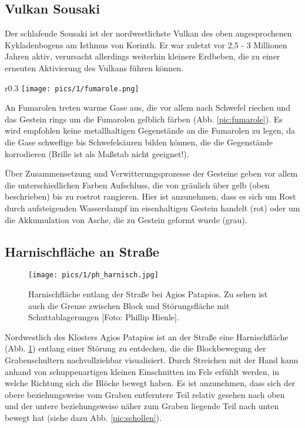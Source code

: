 \documentclass[preprint]{geomorphica} %
\begin{document}
\subsection{Vulkan Sousaki}

Der schlafende Sousaki ist der nordwestlichste Vulkan des oben angesprochenen Kykladenbogens am Isthmus von Korinth. Er war zuletzt vor 2,5 - 3 Millionen Jahren aktiv, verursacht allerdings weiterhin kleinere Erdbeben, die zu einer erneuten Aktivierung des Vulkans führen können.

\begin{wrapfigure}{r}{0.3\textwidth}
    \centering
    \texttt{[image: pics/1/fumarole.png]}
    \caption{Fumarole am Vulkan Sousaki.}
    \vspace{-10mm}
    \label{pic:fumarole}
\end{wrapfigure}

An Fumarolen treten warme Gase aus, die vor allem nach Schwefel riechen und das Gestein rings um die Fumarolen gelblich färben (Abb. \ref{pic:fumarole}). Es wird empfohlen keine metallhaltigen Gegenstände an die Fumarolen zu legen, da die Gase schweflige bis Schwefelsäuren bilden können, die die Gegenstände korrodieren (Brille ist als Maßstab nicht geeignet!). 

Über Zusammensetzung und Verwitterungsprozesse der Gesteine geben vor allem die unterschiedlichen Farben Aufschluss, die von gräulich über gelb (oben beschrieben) bis zu rostrot rangieren. Hier ist anzunehmen, dass es sich um Rost durch aufsteigenden Wasserdampf im eisenhaltigen Gestein handelt (rot) oder um die Akkumulation von Asche, die zu Gestein geformt wurde (grau).

\subsection{Harnischfläche an Straße}

\begin{figure}[h]
    \centering
    \texttt{[image: pics/1/ph\_harnisch.jpg]}
    \caption{Harnischfläche entlang der Straße bei Agios Patapios. Zu sehen ist auch die Grenze zwischen Block und Störungsfläche mit Schuttablagerungen [Foto: Phillip Hienle].}
    \label{pic:harnisch}
\end{figure}

Nordwestlich des Klosters Agios Patapios ist an der Straße eine Harnischfläche (Abb. \ref{pic:harnisch}) entlang einer Störung zu entdecken, die die Blockbewegung der Grabenschultern nachvollziehbar visualisiert. Durch Streichen mit der Hand kann anhand von schuppenartigen kleinen Einschnitten im Fels erfühlt werden, in welche Richtung sich die Blöcke bewegt haben. Es ist anzunehmen, dass sich der obere beziehungsweise vom Graben entferntere Teil relativ gesehen nach oben und der untere beziehungsweise näher zum Graben liegende Teil nach unten bewegt hat (siehe dazu Abb. \ref{pic:schollen}).
\end{document}
